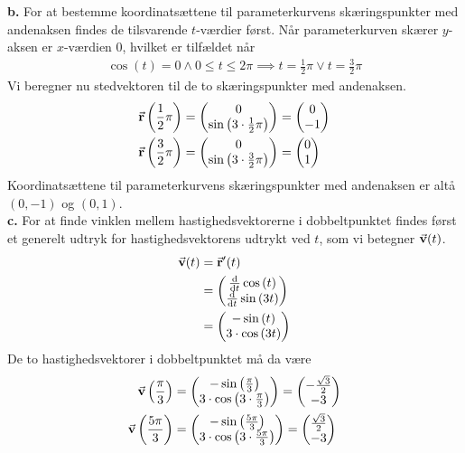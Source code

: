 \documentclass{article}
\begin{document}
\textbf{b.}
For at bestemme koordinatsættene til parameterkurvens skæringspunkter med andenaksen findes de tilsvarende $t$-værdier først.
Når parameterkurven skærer $y$-aksen er $x$-værdien $0$, hvilket er tilfældet når 
\begin{equation*}
\begin{split}
  \cos\left(t\right) =0 \land 0 \leq t \leq 2 \pi \implies t=\frac{1}{2}\pi \lor t=\frac{3}{2} \pi 
\end{split}
\end{equation*}
Vi beregner nu stedvektoren til de to skæringspunkter med andenaksen.
\begin{equation*}
\begin{split}
  \va{r} \left( \frac{1}{2}\pi \right)&=\mqty(0\\ \sin\left(3 \cdot \frac{1}{2} \pi \right) ) =\mqty(0\\ -1) \\
  \va{r} \left(\frac{3}{2} \pi \right) &=\mqty(0\\ \sin\left(3 \cdot \frac{3}{2} \pi  \right) ) =\mqty(0\\ 1) 
\end{split}
\end{equation*}
Koordinatsættene til parameterkurvens skæringspunkter med andenaksen er altå $(0,-1)$ og $(0,1)$.\\[1ex]
\textbf{c.}
For at finde vinklen mellem hastighedsvektorerne i dobbeltpunktet findes først et generelt udtryk for hastighedsvektorens udtrykt ved $t$, som vi betegner $\va{v}(t)$.
\begin{equation*}
\begin{split}
  \va{v}(t)&=\va{r}'(t)\\
  &=\mqty(\dv{t}\cos\left(t\right)  \\ \dv{t} \sin\left(3t\right))  \\
  &=\mqty(-\sin\left(t\right) \\ 3 \cdot \cos\left(3t\right) ) 
\end{split}
\end{equation*}
De to hastighedsvektorer i dobbeltpunktet må da være
\begin{equation*}
\begin{split}
  \va{v} \left(\frac{\pi }{3}\right) &=\mqty(-\sin\left(\frac{\pi }{3}\right) \\ 3 \cdot \cos\left(3 \cdot \frac{\pi }{3}\right) ) =\mqty(-\frac{\sqrt{3} }{2}\\ -3) \\
  \va{v} \left(\frac{5 \pi }{3}\right) &=\mqty(-\sin\left(\frac{5 \pi }{3}\right) \\ 3 \cdot \cos\left(3 \cdot \frac{5 \pi }{3}\right) ) =\mqty(\frac{\sqrt{3} }{2}\\ -3) 
\end{split}
\end{equation*}
\end{document}
